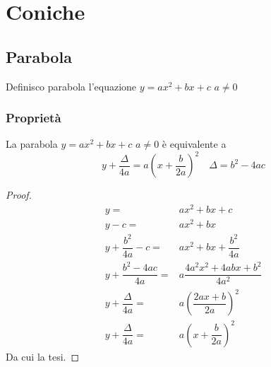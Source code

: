 \chapter{Coniche}
\section{Parabola}
\begin{defn}
	Definisco parabola l'equazione $y=ax^2+bx+c$ $a\neq0$
\end{defn}
\subsection{Proprietà}
\begin{thm}\label{thm:Parabola_complemento}
	La parabola $y=ax^2+bx+c$ $a\neq0$ è equivalente a \begin{equation*}
		y+\dfrac{\Delta}{4a}=a\left(x+\dfrac{b}{2a}\right)^2\quad\Delta=b^2-4ac
	\end{equation*}\label{equa:Parabola_scomposizione}
\end{thm}
\begin{proof}
	\begin{align*}
		y=&ax^2+bx+c\\
		y-c=&ax^2+bx\\
		y+\dfrac{b^2}{4a}-c=&ax^2+bx+\dfrac{b^2}{4a}\\
		y+\dfrac{b^2-4ac}{4a}=&a\dfrac{4a^2x^2+4abx+b^2}{4a^2}\\
		y+\dfrac{\Delta}{4a}=&a\left(\dfrac{2ax+b}{2a}\right)^2\\
		y+\dfrac{\Delta}{4a}=&a\left(x+\dfrac{b}{2a}\right)^2
	\end{align*}
	Da cui la tesi.
\end{proof}
